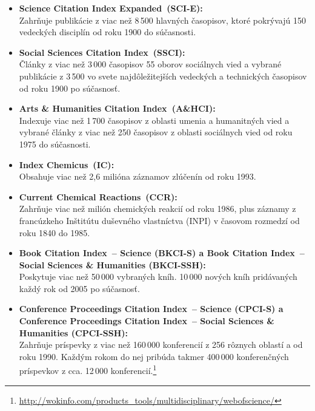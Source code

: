 \begin{itemize}

\item \textbf{Science Citation Index Expanded\R\ (SCI-E):}\\
  Zahrňuje publikácie z viac než 8\,500 hlavných časopisov, ktoré pokrývajú 150
  vedeckých disciplín od roku 1900 do súčasnosti.


\item \textbf{Social Sciences Citation Index\R\ (SSCI):}\\
  Články z viac než 3\,000 časopisov 55 oborov sociálnych vied a vybrané
  publikácie z 3\,500 vo svete najdôležitejších vedeckých a technických časopisov
  od roku 1900 po súčasnosť.


\item \textbf{Arts \& Humanities Citation Index\R\ (A\&HCI):}\\
  Indexuje viac než 1\,700 časopisov z oblasti umenia a humanitných vied a
  vybrané články z viac než 250 časopisov z oblasti sociálnych vied od roku 1975
  do súčasnosti.

\item \textbf{Index Chemicus\R\ (IC):}\\
  Obsahuje viac než 2,6 milióna záznamov zlúčenín od roku 1993.

\item \textbf{Current Chemical Reactions\R\ (CCR):}\\
  Zahrňuje viac než milión chemických reakcií od roku 1986, plus záznamy z
  francúzkeho Inštitútu duševného vlastníctva (INPI) v časovom rozmedzí od roku
  1840 do 1985.

\item \textbf{Book Citation Index\R\ -- Science (BKCI-S) a Book Citation Index\R\ -- Social Sciences \& Humanities (BKCI-SSH):}\\
  Poskytuje viac než 50\,000 vybraných kníh. 10\,000 nových kníh pridávaných každý
  rok od 2005 po súčasnosť.

\item \textbf{Conference Proceedings Citation Index\R\ -- Science (CPCI-S) a Conference Proceedings Citation Index\R\ -- Social Sciences \& Humanities (CPCI-SSH):}\\
  Zahrňuje príspevky z viac než 160\,000 konferencií z 256 rôznych oblastí  a  od roku
  1990. Každým rokom do nej pribúda takmer 400\,000 konferenčných príspevkov z
  cca. 12\,000
  konferencií.\footnote{\url{http://wokinfo.com/products_tools/multidisciplinary/webofscience/}}

\end{itemize}

